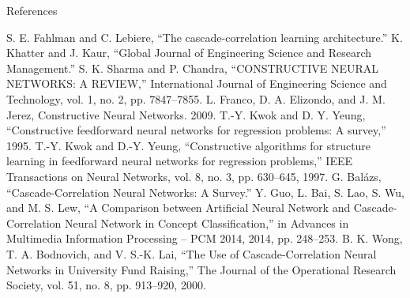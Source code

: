 \documentclass[presentation]{beamer}
\begin{document}
\begin{frame}[allowframebreaks, t]{References}
  \tiny
  \begin{thebibliography}{99}
    \bibitem[]{} S. E. Fahlman and C. Lebiere, “The cascade-correlation learning architecture.”
    \bibitem[]{} K. Khatter and J. Kaur, “Global Journal of Engineering Science and Research Management.”
    \bibitem[]{} S. K. Sharma and P. Chandra, “CONSTRUCTIVE NEURAL NETWORKS: A REVIEW,” International Journal of Engineering Science and Technology, vol. 1, no. 2, pp. 7847–7855.
    \bibitem[]{} L. Franco, D. A. Elizondo, and J. M. Jerez, Constructive Neural Networks. 2009.
    \bibitem[]{} T.-Y. Kwok and D. Y. Yeung, “Constructive feedforward neural networks for regression problems: A survey,” 1995.
    \bibitem[]{} T.-Y. Kwok and D.-Y. Yeung, “Constructive algorithms for structure learning in feedforward neural networks for regression problems,” IEEE Transactions on Neural Networks, vol. 8, no. 3, pp. 630–645, 1997.
    \bibitem[]{} G. Balázs, “Cascade-Correlation Neural Networks: A Survey.”
    \bibitem[]{} Y. Guo, L. Bai, S. Lao, S. Wu, and M. S. Lew, “A Comparison between Artificial Neural Network and Cascade-Correlation Neural Network in Concept Classification,” in Advances in Multimedia Information Processing – PCM 2014, 2014, pp. 248–253.
    \bibitem{} B. K. Wong, T. A. Bodnovich, and V. S.-K. Lai, “The Use of
    Cascade-Correlation Neural Networks in University Fund Raising,” The Journal
    of the Operational Research Society, vol. 51, no. 8, pp. 913–920, 2000. \\
    

\end{thebibliography}
\end{frame}
\end{document}
